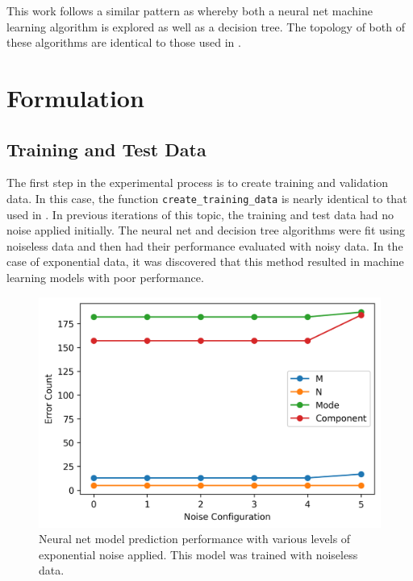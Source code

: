 \documentclass[conference]{IEEEtran}
\begin{document}
This work follows a similar pattern as \cite{newberry_machine_2022-1} whereby both a neural net machine learning algorithm is explored as well as a decision tree. 
The topology of both of these algorithms are identical to those used in \cite{newberry_machine_2022-1}. 


\section{Formulation}
\subsection{Training and Test Data}
The first step in the experimental process is to create training and validation data. In this case, the function \verb*|create_training_data| is nearly identical to that used in \cite{newberry_machine_2022-1}.
In previous iterations of this topic, the training and test data had no noise applied initially.
The neural net and decision tree algorithms were fit using noiseless data and then had their performance evaluated with noisy data.
In the case of exponential data, it was discovered that this method resulted in machine learning models with poor performance.

\begin{figure}
	\centering
	\includegraphics[width=1\linewidth]{images/predictions_nn_model_noiseless_training}
	\caption{Neural net model prediction performance with various levels of exponential noise applied. This model was trained with noiseless data.}
	\label{fig:predictions_nn_model_noiseless_training}
\end{figure}
\end{document}
